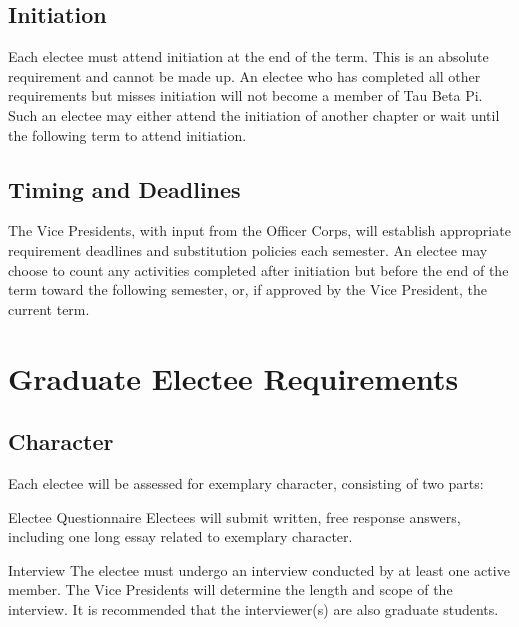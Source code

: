 \section{Initiation}
Each electee must attend initiation at the end of the term.
This is an absolute requirement and cannot be made up. An electee who has completed all
other requirements but misses initiation will not become a member of Tau Beta Pi. Such an
electee may either attend the initiation of another chapter or wait until the following term
to attend initiation.

\section{Timing and Deadlines}
The Vice Presidents, with input from the Officer Corps, will establish appropriate requirement deadlines and substitution policies each semester. 
An electee may choose to count any activities completed after initiation but before the end of the term toward the following semester, or, if approved by the Vice President, the current term.

\chapter{Graduate Electee Requirements}\label{sec:gradreqs}
\section{Character}
Each electee will be assessed for exemplary character, consisting of two parts:
\begin{enumsubsection}
  \item {Electee Questionnaire} Electees will submit written, free response answers, including one long essay related to exemplary character.
  \item {Interview} The electee must undergo an interview conducted by at least one active member. The Vice Presidents will determine the length and scope of the interview. It is recommended that the interviewer(s) are also graduate students. 
\end{enumsubsection}

